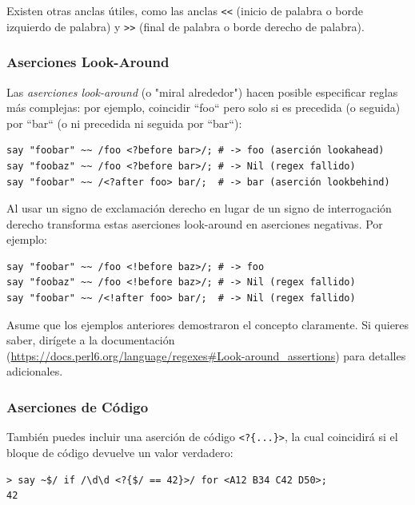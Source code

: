 Existen otras anclas útiles, como las anclas \verb|<<| (inicio de palabra 
o borde izquierdo de palabra) y \verb|>>| (final de palabra o
borde derecho de palabra).

\subsubsection{Aserciones Look-Around}


Las \emph{aserciones look-around} (o "miral alrededor") hacen posible especificar 
reglas más complejas: por ejemplo,  coincidir ``foo`` pero solo
si es precedida (o seguida) por ``bar`` (o ni precedida ni
seguida por ``bar``):
\begin{verbatim}
say "foobar" ~~ /foo <?before bar>/; # -> foo (aserción lookahead)
say "foobaz" ~~ /foo <?before bar>/; # -> Nil (regex fallido)
say "foobar" ~~ /<?after foo> bar/;  # -> bar (aserción lookbehind)
\end{verbatim}
%
Al usar un signo de exclamación derecho en lugar de un signo de
interrogación derecho transforma estas aserciones look-around 
en aserciones negativas. Por ejemplo:

\begin{verbatim}
say "foobar" ~~ /foo <!before baz>/; # -> foo 
say "foobaz" ~~ /foo <!before baz>/; # -> Nil (regex fallido)
say "foobar" ~~ /<!after foo> bar/;  # -> Nil (regex fallido)
\end{verbatim}
%
Asume que los ejemplos anteriores demostraron el concepto 
claramente. Si quieres saber, dirígete a la documentación
(\url{https://docs.perl6.org/language/regexes#Look-around_assertions}) 
para detalles adicionales. 

\subsubsection{Aserciones de Código}

También puedes incluir una aserción de código \verb|<?{...}>|,
la cual coincidirá si el bloque de código devuelve un valor
verdadero:

\begin{verbatim}
> say ~$/ if /\d\d <?{$/ == 42}>/ for <A12 B34 C42 D50>;
42
\end{verbatim}


